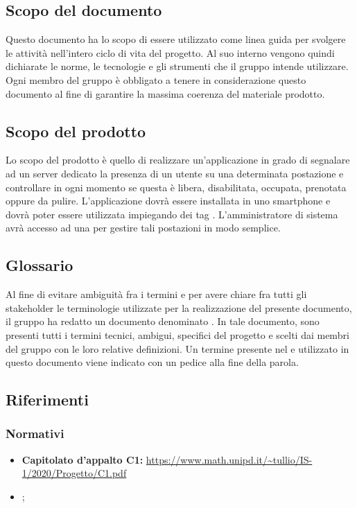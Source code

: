 \subsection{Scopo del documento}
Questo documento ha lo scopo di essere utilizzato come linea guida per svolgere le attività nell'intero ciclo di vita del progetto. Al suo interno vengono quindi dichiarate le norme, le tecnologie e gli strumenti che il gruppo \Gruppo{} intende utilizzare.
Ogni membro del gruppo è obbligato a tenere in considerazione questo documento al fine di garantire la massima coerenza del materiale prodotto.
	
\subsection{Scopo del prodotto}
Lo scopo del prodotto è quello di realizzare un’applicazione in grado di segnalare ad un server
dedicato la presenza di un utente su una determinata postazione e controllare in ogni momento
se questa è libera, disabilitata, occupata, prenotata oppure da pulire. L’applicazione dovrà essere
installata in uno smartphone  e dovrà poter essere utilizzata impiegando
dei tag . L'amministratore di sistema avrà accesso ad una  per gestire tali postazioni in modo semplice.

\subsection{Glossario}
Al fine di evitare ambiguità fra i termini e per avere chiare fra tutti gli stakeholder le terminologie utilizzate per la realizzazione del presente documento, il gruppo \Gruppo{} ha redatto un documento denominato \Gv{}.
In tale documento, sono presenti tutti i termini tecnici, ambigui, specifici del progetto e scelti dai membri del gruppo con le loro relative definizioni.
Un termine presente nel \Gv{} e utilizzato in questo documento viene indicato con un pedice \glo{} alla fine della parola.

\subsection{Riferimenti} 
\subsubsection{Normativi}
\begin{itemize}
	\item \textbf{Capitolato d'appalto C1:} \url{https://www.math.unipd.it/~tullio/IS-1/2020/Progetto/C1.pdf}
	\item \NdPv{};
\end{itemize}

